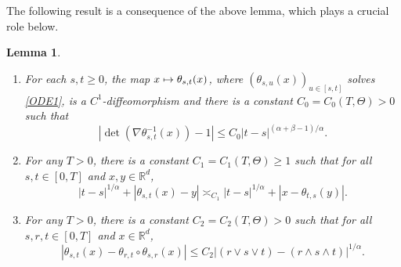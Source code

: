 \documentclass[11pt]{article}
\newcommand{\skpt}{\smallskip}
\numberwithin{equation}{section}\providecommand{\asymp}{\mathrel{\sim}}
\def\mto{\mathchoice{\longmapsto}{\mapsto}{\mapsto}{\mapsto}}
\theoremstyle{plain}
\newtheorem{lemma}[theorem]{Lemma}
\theoremstyle{definition}
\newcommand\mR{\mathbb{R}}
\newcommand\1{{\mathbf{1}}}
\begin{document}
The following result is a consequence of the above lemma, which plays a crucial role below.
\skpt
\begin{lemma}\label{Le22}
\begin{enumerate}
\item\label{Le22i}
For each $s,t\geq 0$, the map $x\mto \theta_{s,t}(x)$, where $(\theta_{s,u}(x))_{u\in [s,t]}$ solves \eqref{ODE1},
is a $C^1$-diffeomorphism and there is a constant $C_0=C_0(T,\Theta)>0$
such that
\[
|\det(\nabla\theta^{-1}_{s,t}(x))-1|\le C_0|t-s|^{(\alpha+\beta-1)/\alpha}.
\]
\item\label{Le22ii}
For any $T>0$, there is a constant $C_1=C_1(T,\Theta)\geq 1$
such that for all $s,t\in[0,T]$ and $x,y\in\mR^d$,
\begin{equation}\label{KH2}
|t-s|^{1/\alpha}+|\theta_{s,t}(x)-y|\asymp_{C_1}|t-s|^{1/\alpha}+|x-\theta_{t,s}(y)|.
\end{equation}
\item\label{Le22iii}
For any $T>0$, there is a constant $C_2=C_2(T,\Theta)>0$ such that for all $s,r,t\in[0,T]$ and $x\in\mR^d$,
\begin{equation}\label{KH1}
|\theta_{s,t}(x)-\theta_{r,t}\circ\theta_{s,r}(x)|\le C_2 |(r\vee s\vee t)-(r\wedge s\wedge t)|^{1/\alpha}.
\end{equation}
\end{enumerate}
\end{lemma}
\skpt
\end{document}
